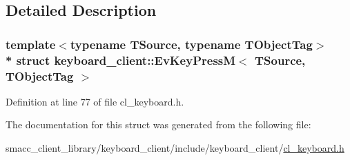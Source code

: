 \subsection{Detailed Description}
\subsubsection*{template$<$typename T\+Source, typename T\+Object\+Tag$>$\\*
struct keyboard\+\_\+client\+::\+Ev\+Key\+Press\+M$<$ T\+Source, T\+Object\+Tag $>$}



Definition at line 77 of file cl\+\_\+keyboard.\+h.



The documentation for this struct was generated from the following file\+:\begin{DoxyCompactItemize}
\item 
smacc\+\_\+client\+\_\+library/keyboard\+\_\+client/include/keyboard\+\_\+client/\hyperlink{cl__keyboard_8h}{cl\+\_\+keyboard.\+h}\end{DoxyCompactItemize}
